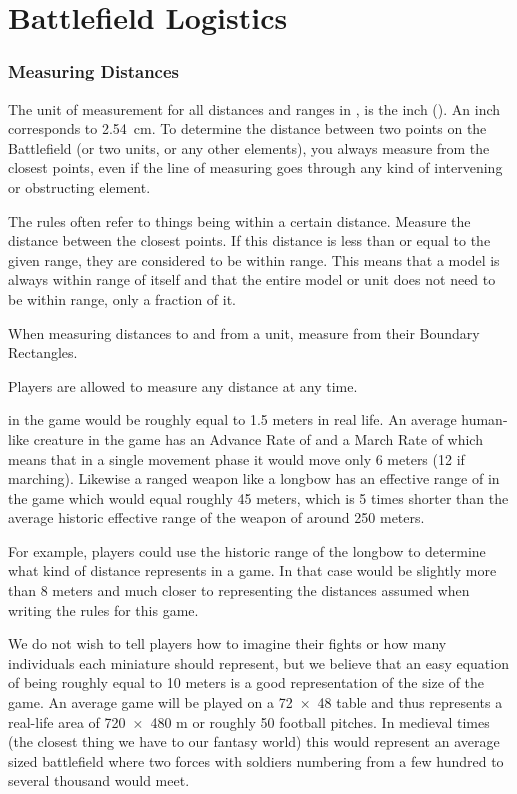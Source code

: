
\part{Battlefield Logistics}

\section{Measuring Distances}
\label{measuring_distances}

The unit of measurement for all distances and ranges in \nameofthegame{}, is the inch (\si{\inch}). An inch corresponds to \SI{2.54}{\centi\meter}. To determine the distance between two points on the Battlefield (or two units, or any other elements), you always measure from the closest points, even if the line of measuring goes through any kind of intervening or obstructing element.

The rules often refer to things being within a certain distance. Measure the distance between the closest points. If this distance is less than or equal to the given range, they are considered to be within range. This means that a model is always within range of itself and that the entire model or unit does not need to be within range, only a fraction of it.

When measuring distances to and from a unit, measure from their Boundary Rectangles.

Players are allowed to measure any distance at any time.

 in the game would be roughly equal to \num{1.5} meters in real life. An average human-like creature in the game has an Advance Rate of  and a March Rate of  which means that in a single movement phase it would move only \num{6} meters (\num{12} if marching). Likewise a ranged weapon like a longbow has an effective range of  in the game which would equal roughly \num{45} meters, which is 5 times shorter than the average historic effective range of the weapon of around \num{250} meters.

For example, players could use the historic range of the longbow to determine what kind of distance  represents in a game. In that case  would be slightly more than 8 meters and much closer to representing the distances assumed when writing the rules for this game.

We do not wish to tell players how to imagine their fights or how many individuals each miniature should represent, but we believe that an easy equation of  being roughly equal to \num{10} meters is a good representation of the size of the game. An average game will be played on a \num{72x48}\si{\inch} table and thus represents a real-life area of \num{720x480} \si{\meter} or roughly 50 football pitches. In medieval times (the closest thing we have to our fantasy world) this would represent an average sized battlefield where two forces with soldiers numbering from a few hundred to several thousand would meet.

